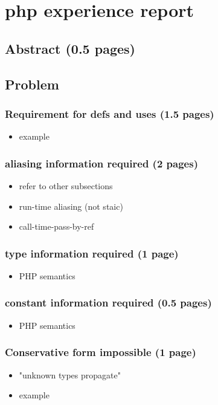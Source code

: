 \applynumberofpages\chapter{php experience report }


\section{Abstract (0.5 pages)}

\section{Problem}

\subsection{Requirement for defs and uses (1.5 pages)}
\begin{itemize}
	\item example
\end{itemize}

\subsection{aliasing information required (2 pages)}
\begin{itemize}
	\item refer to other subsections
	\item run-time aliasing (not staic)
	\item call-time-pass-by-ref
\end{itemize}

\subsection{type information required (1 page)}
\begin{itemize}
	\item PHP semantics
\end{itemize}

\subsection{constant information required (0.5 pages)}
\begin{itemize}
	\item PHP semantics
\end{itemize}

\subsection{Conservative form impossible (1 page)}
\begin{itemize}
	\item "unknown types propagate"
	\item example
\end{itemize}

